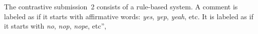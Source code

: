  
The contrastive submission~2 consists of a rule-based system. A comment is 
labeled as \yes if it starts with affirmative words: \textit{yes}, \textit{yep}, 
\textit{yeah}, etc.
It is labeled as \no if it starts with \textit{no}, \textit{nop}, \textit{nope}, 
etc”, 







% 
% 


